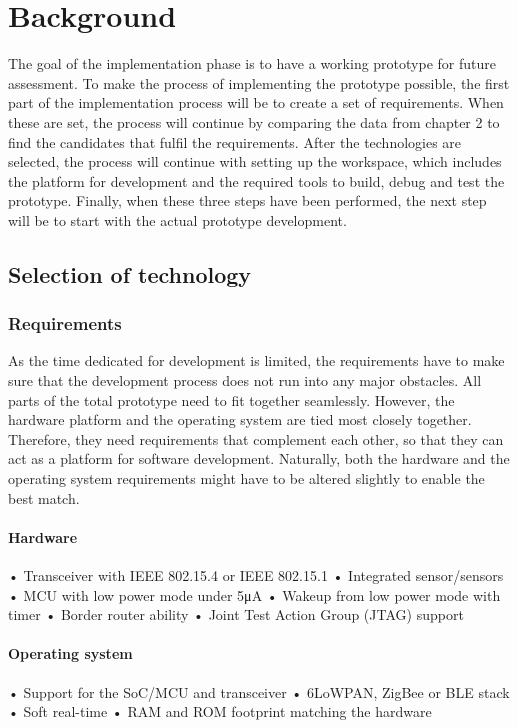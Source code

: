 \section{Background}

The goal of the implementation phase is to have a working prototype for future assessment.
To make the process of implementing the prototype possible,
	the first part of the implementation process will be to create a set of requirements.
When these are set,
	the process will continue by comparing the data from chapter 2 to find the candidates that fulfil the requirements.
After the technologies are selected,
	the process will continue with setting up the workspace,
	which includes the platform for development and the required tools to build,
	debug and test the prototype.
Finally,
	when these three steps have been performed,
	the next step will be to start with the actual prototype development.
	
\subsection{Selection of technology}

\subsubsection{Requirements}
As the time dedicated for development is limited,
	the requirements have to make sure that the development process does not run into any major obstacles.
All parts of the total prototype need to fit together seamlessly.
However,
	the hardware platform and the operating system are tied most closely together.
Therefore,
	they need requirements that complement each other,
	so that they can act as a platform for software development.
Naturally,
	both the hardware and the operating system requirements might have to be altered slightly to enable the best match.
	
\paragraph{Hardware}
• Transceiver with IEEE 802.15.4 or IEEE 802.15.1
• Integrated sensor/sensors
• MCU with low power mode under 5μA
• Wakeup from low power mode with timer
• Border router ability
• Joint Test Action Group (JTAG) support

\paragraph{Operating system}
• Support for the SoC/MCU and transceiver
• 6LoWPAN, ZigBee or BLE stack
• Soft real-time
• RAM and ROM footprint matching the hardware

